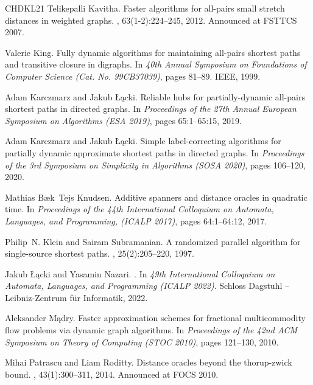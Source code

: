 \documentclass[11pt]{article}
\theoremstyle{definition}
\theoremstyle{remark}
\begin{document}
\begin{titlepage}
\begin{thebibliography}{CHDKL21}
Telikepalli Kavitha.
\newblock Faster algorithms for all-pairs small stretch distances in weighted
  graphs.
, 63(1-2):224--245, 2012.
\newblock Announced at {FSTTCS} 2007.

Valerie King.
\newblock Fully dynamic algorithms for maintaining all-pairs shortest paths and
  transitive closure in digraphs.
\newblock In {\em 40th Annual Symposium on Foundations of Computer Science
  (Cat. No. 99CB37039)}, pages 81--89. IEEE, 1999.

Adam Karczmarz and Jakub {\L}ącki.
\newblock Reliable hubs for partially-dynamic all-pairs shortest paths in
  directed graphs.
\newblock In {\em Proceedings of the 27th Annual European Symposium on
  Algorithms ({ESA} 2019)}, pages 65:1--65:15, 2019.

Adam Karczmarz and Jakub {\L}ącki.
\newblock Simple label-correcting algorithms for partially dynamic approximate
  shortest paths in directed graphs.
\newblock In {\em Proceedings of the 3rd Symposium on Simplicity in Algorithms
  ({SOSA} 2020)}, pages 106--120, 2020.

Mathias B{\ae}k~Tejs Knudsen.
\newblock Additive spanners and distance oracles in quadratic time.
\newblock In {\em Proceedings of the 44th International Colloquium on Automata,
  Languages, and Programming, ({ICALP} 2017)}, pages 64:1--64:12, 2017.

Philip~N. Klein and Sairam Subramanian.
\newblock A randomized parallel algorithm for single-source shortest paths.
, 25(2):205--220, 1997.

Jakub {\L}ącki and Yasamin Nazari.
.
\newblock In {\em 49th International Colloquium on Automata, Languages, and
  Programming (ICALP 2022)}. Schloss Dagstuhl -- Leibniz-Zentrum f{\"u}r
  Informatik, 2022.

Aleksander Mądry.
\newblock Faster approximation schemes for fractional multicommodity flow
  problems via dynamic graph algorithms.
\newblock In {\em Proceedings of the 42nd {ACM} Symposium on Theory of
  Computing (STOC 2010)}, pages 121--130, 2010.

Mihai Patrascu and Liam Roditty.
\newblock Distance oracles beyond the thorup-zwick bound.
, 43(1):300--311, 2014.
\newblock Announced at {FOCS} 2010.


\end{thebibliography}
\end{titlepage}
\end{document}
